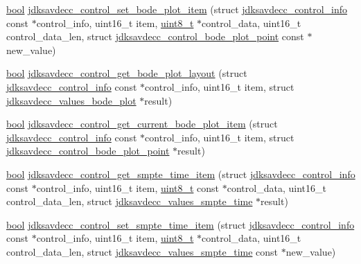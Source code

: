 \begin{DoxyCompactItemize}
\item 
\hyperlink{avb__gptp_8h_af6a258d8f3ee5206d682d799316314b1}{bool} \hyperlink{group__aem__control__value__helpers_ga4a7028b618bceea9b401faf745e3c189}{jdksavdecc\+\_\+control\+\_\+set\+\_\+bode\+\_\+plot\+\_\+item} (struct \hyperlink{structjdksavdecc__control__info}{jdksavdecc\+\_\+control\+\_\+info} const $\ast$control\+\_\+info, uint16\+\_\+t item, \hyperlink{stdint_8h_aba7bc1797add20fe3efdf37ced1182c5}{uint8\+\_\+t} $\ast$control\+\_\+data, uint16\+\_\+t control\+\_\+data\+\_\+len, struct \hyperlink{structjdksavdecc__control__bode__plot__point}{jdksavdecc\+\_\+control\+\_\+bode\+\_\+plot\+\_\+point} const $\ast$new\+\_\+value)
\item 
\hyperlink{avb__gptp_8h_af6a258d8f3ee5206d682d799316314b1}{bool} \hyperlink{group__aem__control__value__helpers_ga651524b8ae719861d44b02ab347eee57}{jdksavdecc\+\_\+control\+\_\+get\+\_\+bode\+\_\+plot\+\_\+layout} (struct \hyperlink{structjdksavdecc__control__info}{jdksavdecc\+\_\+control\+\_\+info} const $\ast$control\+\_\+info, uint16\+\_\+t item, struct \hyperlink{structjdksavdecc__values__bode__plot}{jdksavdecc\+\_\+values\+\_\+bode\+\_\+plot} $\ast$result)
\item 
\hyperlink{avb__gptp_8h_af6a258d8f3ee5206d682d799316314b1}{bool} \hyperlink{group__aem__control__value__helpers_ga5381ac03ada0bc5a311eaf31ff81c40e}{jdksavdecc\+\_\+control\+\_\+get\+\_\+current\+\_\+bode\+\_\+plot\+\_\+item} (struct \hyperlink{structjdksavdecc__control__info}{jdksavdecc\+\_\+control\+\_\+info} const $\ast$control\+\_\+info, uint16\+\_\+t item, struct \hyperlink{structjdksavdecc__control__bode__plot__point}{jdksavdecc\+\_\+control\+\_\+bode\+\_\+plot\+\_\+point} $\ast$result)
\item 
\hyperlink{avb__gptp_8h_af6a258d8f3ee5206d682d799316314b1}{bool} \hyperlink{group__aem__control__value__helpers_ga05e9117d58869f379fe85f644e61774e}{jdksavdecc\+\_\+control\+\_\+get\+\_\+smpte\+\_\+time\+\_\+item} (struct \hyperlink{structjdksavdecc__control__info}{jdksavdecc\+\_\+control\+\_\+info} const $\ast$control\+\_\+info, uint16\+\_\+t item, \hyperlink{stdint_8h_aba7bc1797add20fe3efdf37ced1182c5}{uint8\+\_\+t} const $\ast$control\+\_\+data, uint16\+\_\+t control\+\_\+data\+\_\+len, struct \hyperlink{structjdksavdecc__values__smpte__time}{jdksavdecc\+\_\+values\+\_\+smpte\+\_\+time} $\ast$result)
\item 
\hyperlink{avb__gptp_8h_af6a258d8f3ee5206d682d799316314b1}{bool} \hyperlink{group__aem__control__value__helpers_ga1ef1dc62ac934481a7986b0d9e90a3e7}{jdksavdecc\+\_\+control\+\_\+set\+\_\+smpte\+\_\+time\+\_\+item} (struct \hyperlink{structjdksavdecc__control__info}{jdksavdecc\+\_\+control\+\_\+info} const $\ast$control\+\_\+info, uint16\+\_\+t item, \hyperlink{stdint_8h_aba7bc1797add20fe3efdf37ced1182c5}{uint8\+\_\+t} $\ast$control\+\_\+data, uint16\+\_\+t control\+\_\+data\+\_\+len, struct \hyperlink{structjdksavdecc__values__smpte__time}{jdksavdecc\+\_\+values\+\_\+smpte\+\_\+time} const $\ast$new\+\_\+value)

\end{DoxyCompactItemize}
